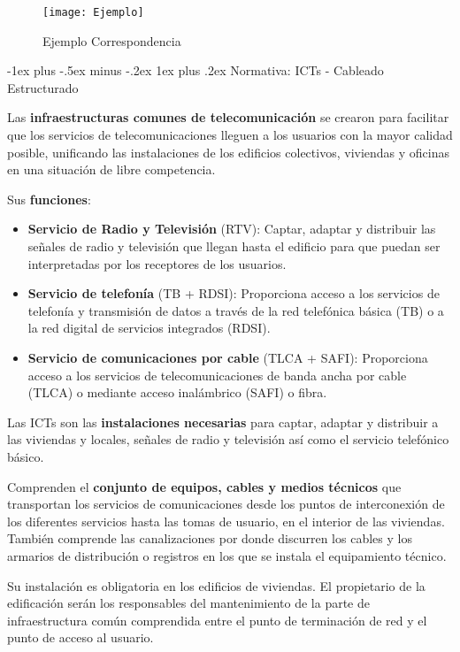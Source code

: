 \documentclass[10pt,portrait, twocolumn]{article}
\makeatletter
\renewcommand{\subsubsection}{\@startsection{subsubsection}{3}{0mm}%
                                {-1ex plus -.5ex minus -.2ex}%
                                {1ex plus .2ex}%
                                {\normalfont\small\bfseries}}
\makeatother
\begin{document}
\begin{figure}[h]
	\centering
     \texttt{[image: Ejemplo]}
      \caption{Ejemplo Correspondencia}
  \end{figure}


\subsubsection{Normativa: ICTs - Cableado Estructurado}

Las \textbf{infraestructuras comunes de telecomunicación} se crearon para facilitar que los servicios de telecomunicaciones lleguen a los usuarios con la mayor calidad posible, unificando las instalaciones de los edificios colectivos, viviendas y oficinas en una situación de libre competencia. 

\quad Sus \textbf{funciones}:

	\begin{itemize}
		\item \textbf{Servicio de Radio y Televisión} (RTV): Captar, adaptar y distribuir las señales de radio y televisión que llegan hasta el edificio para que puedan ser interpretadas por los receptores de los usuarios.
		\item \textbf{Servicio de telefonía} (TB + RDSI): Proporciona acceso a los servicios de telefonía y transmisión de datos a través de la red telefónica básica (TB) o a la red digital de servicios integrados (RDSI).
		\item \textbf{Servicio de comunicaciones por cable} (TLCA + SAFI): Proporciona acceso a los servicios de telecomunicaciones de banda ancha por cable (TLCA) o mediante acceso inalámbrico (SAFI) o fibra.
	\end{itemize}
	
Las ICTs son las \textbf{instalaciones necesarias} para captar, adaptar y distribuir a las viviendas y locales, señales de radio y televisión así como el servicio telefónico básico. 

\quad Comprenden el \textbf{conjunto de equipos, cables y medios técnicos} que transportan los servicios de comunicaciones desde los puntos de interconexión de los diferentes servicios hasta las tomas de usuario, en el interior de las viviendas. También comprende las canalizaciones por donde discurren los cables y los armarios de distribución o registros en los que se instala el equipamiento técnico.

\quad Su instalación es obligatoria en los edificios de viviendas. El propietario de la edificación serán los responsables del mantenimiento de la parte de infraestructura común comprendida entre el punto de terminación de red y el punto de acceso al usuario.
\end{document}
